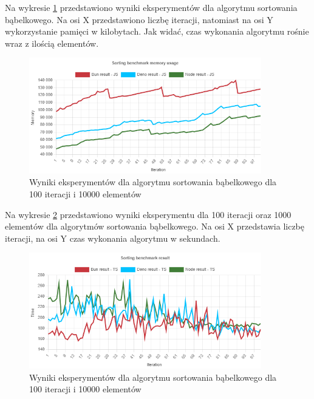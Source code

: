 Na wykresie \ref{fig:bubble_sorting_e5_memory_js} przedstawiono wyniki eksperymentów dla algorytmu sortowania bąbelkowego. Na osi X przedstawiono liczbę iteracji, natomiast na osi Y wykorzystanie pamięci w kilobytach. Jak widać, czas wykonania algorytmu rośnie wraz z ilością elementów.
\begin{figure}[H]
  \centering
  \includegraphics[width=0.9\textwidth]{Figures/sorting/bubble/e5_memory_js.png}
  \caption{Wyniki eksperymentów dla algorytmu sortowania bąbelkowego dla 100 iteracji i 10000 elementów}
  \label{fig:bubble_sorting_e5_memory_js}
\end{figure}

Na wykresie \ref{fig:bubble_sorting_e5_ts} przedstawiono wyniki eksperymentu dla 100 iteracji oraz 1000 elementów dla algorytmów sortowania bąbelkowego. Na osi X przedstawia liczbę iteracji, na osi Y czas wykonania algorytmu w sekundach. 

\begin{figure}[H]
  \centering
  \includegraphics[width=0.9\textwidth]{Figures/sorting/bubble/e5_ts.png}
  \caption{Wyniki eksperymentów dla algorytmu sortowania bąbelkowego dla 100 iteracji i 10000 elementów}
  \label{fig:bubble_sorting_e5_ts}
\end{figure}

